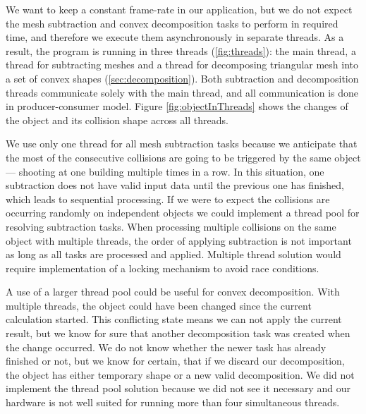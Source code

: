We want to keep a constant frame-rate in our application, but we do not expect the mesh subtraction and convex decomposition tasks to perform in required time, and therefore we execute them asynchronously in separate threads. As a result, the program is running in three threads (\cref{fig:threads}): the main thread, a thread for subtracting meshes and a thread for decomposing triangular mesh into a set of convex shapes (\cref{sec:decomposition}). Both subtraction and decomposition threads communicate solely with the main thread, and all communication is done in producer-consumer model. Figure \ref{fig:objectInThreads} shows the changes of the object and its collision shape across all threads.

We use only one thread for all mesh subtraction tasks because we anticipate that the most of the consecutive collisions are going to be triggered by the same object --- shooting at one building multiple times in a row. In this situation, one subtraction does not have valid input data until the previous one has finished, which leads to sequential processing. If we were to expect the collisions are occurring randomly on independent objects we could implement a thread pool for resolving subtraction tasks. When processing multiple collisions on the same object with multiple threads, the order of applying subtraction is not important as long as all tasks are processed and applied. Multiple thread solution would require implementation of a locking mechanism to avoid race conditions.

A use of a larger thread pool could be useful for convex decomposition. With multiple threads, the object could have been changed since the current calculation started. This conflicting state means we can not apply the current result, but we know for sure that another decomposition task was created when the change occurred. We do not know whether the newer task has already finished or not, but we know for certain, that if we discard our decomposition, the object has either temporary shape or a new valid decomposition. We did not implement the thread pool solution because we did not see it necessary and our hardware  is not well suited for running more than four simultaneous threads.

